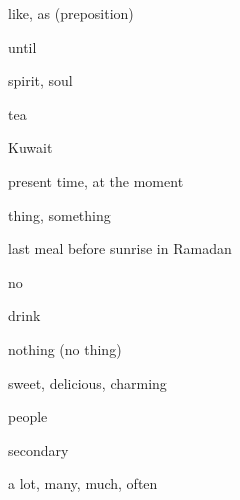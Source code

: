 \documentclass[avery5371,grid,frame]{flashcards}
\begin{document}
\begin{flashcard}{\LARGE like, as (preposition)}
\LARGE {}
\end{flashcard}
\begin{flashcard}{\LARGE until}
\LARGE {}
\end{flashcard}
\begin{flashcard}{\LARGE spirit, soul}
\LARGE {}
\end{flashcard}
\begin{flashcard}{\LARGE tea}
\LARGE {}
\end{flashcard}
\begin{flashcard}{\LARGE Kuwait}
\LARGE {}
\end{flashcard}
\begin{flashcard}{\LARGE present time, at the moment}
\LARGE {}
\end{flashcard}
\begin{flashcard}{\LARGE thing, something}
\LARGE {}
\end{flashcard}
\begin{flashcard}{\LARGE last meal before sunrise in Ramadan}
\LARGE {}
\end{flashcard}
\begin{flashcard}{\LARGE no}
\LARGE {}
\end{flashcard}
\begin{flashcard}{\LARGE drink}
\LARGE {}
\end{flashcard}
\begin{flashcard}{\LARGE nothing (no thing)}
\LARGE {}
\end{flashcard}
\begin{flashcard}{\LARGE sweet, delicious, charming}
\LARGE {}
\end{flashcard}
\begin{flashcard}{\LARGE people}
\LARGE {}
\end{flashcard}
\begin{flashcard}{\LARGE secondary}
\LARGE {}
\end{flashcard}
\begin{flashcard}{\LARGE a lot, many, much, often}
\LARGE {}
\end{flashcard}
\end{document}
